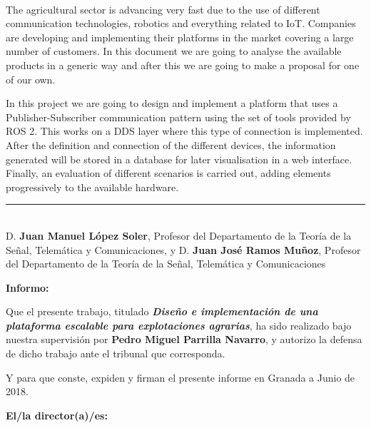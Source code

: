 \\
The agricultural sector is advancing very fast due to the use of different communication technologies, robotics and everything related to IoT. Companies are developing and implementing their platforms in the market covering a large number of customers. In this document we are going to analyse the available products in a generic way and after this we are going to make a proposal for one of our own.

In this project we are going to design and implement a platform that uses a Publisher-Subscriber communication pattern using the set of tools provided by ROS 2. This works on a DDS layer where this type of connection is implemented. After the definition and connection of the different devices, the information generated will be stored in a database for later visualisation in a web interface. Finally, an evaluation of different scenarios is carried out, adding elements progressively to the available hardware.

\cleardoublepage

\thispagestyle{empty}

\noindent\rule[-1ex]{\textwidth}{2pt}\\[4.5ex]

D. \textbf{Juan Manuel López Soler}, Profesor del Departamento de la Teoría de la Señal, Telemática y Comunicaciones, y D. \textbf{Juan José Ramos Muñoz}, Profesor del Departamento de la Teoría de la Señal, Telemática y Comunicaciones

\vspace{0.5cm}

\textbf{Informo:}

\vspace{0.5cm}

Que el presente trabajo, titulado \textit{\textbf{Diseño e implementación de una plataforma escalable para explotaciones agrarias}},
ha sido realizado bajo nuestra supervisión por \textbf{Pedro Miguel Parrilla Navarro}, y autorizo la defensa de dicho trabajo ante el tribunal
que corresponda.

\vspace{0.5cm}

Y para que conste, expiden y firman el presente informe en Granada a Junio de 2018.

\vspace{1cm}

\textbf{El/la director(a)/es: }

\vspace{5cm}


